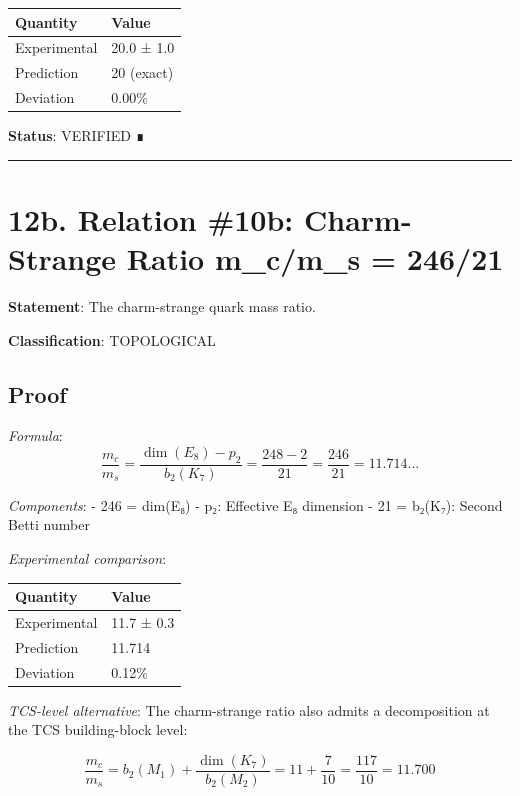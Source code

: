 \documentclass[11pt,a4paper]{article}
\begin{document}
\begin{longtable}[]{@{}ll@{}}
\toprule\noalign{}
Quantity & Value \\
\midrule\noalign{}
\endhead
\bottomrule\noalign{}
\endlastfoot
Experimental & 20.0 ± 1.0 \\
Prediction & 20 (exact) \\
Deviation & 0.00\% \\
\end{longtable}

\textbf{Status}: VERIFIED ∎

\begin{center}\rule{\linewidth}{0.5pt}\end{center}

\section{12b. Relation \#10b: Charm-Strange Ratio m\_\allowbreak{}c/m\_\allowbreak{}s = 246/21}\label{b.-relation-10b-charm-strange-ratio-m_cm_s-24621}

\textbf{Statement}: The charm-strange quark mass ratio.

\textbf{Classification}: TOPOLOGICAL

\subsection{Proof}\label{proof-9}

\emph{Formula}: \[\frac{m_c}{m_s} = \frac{\dim(E_8) - p_2}{b_2(K_7)} = \frac{248 - 2}{21} = \frac{246}{21} = 11.714...\]

\emph{Components}: - 246 = dim(E₈) - p₂: Effective E₈ dimension - 21 = b₂(K₇): Second Betti number

\emph{Experimental comparison}:

\begin{longtable}[]{@{}ll@{}}
\toprule\noalign{}
Quantity & Value \\
\midrule\noalign{}
\endhead
\bottomrule\noalign{}
\endlastfoot
Experimental & 11.7 ± 0.3 \\
Prediction & 11.714 \\
Deviation & 0.12\% \\
\end{longtable}

\emph{TCS-level alternative}: The charm-strange ratio also admits a decomposition at the TCS building-block level:

\[\frac{m_c}{m_s} = b_2(M_1) + \frac{\dim(K_7)}{b_2(M_2)} = 11 + \frac{7}{10} = \frac{117}{10} = 11.700\]
\end{document}
